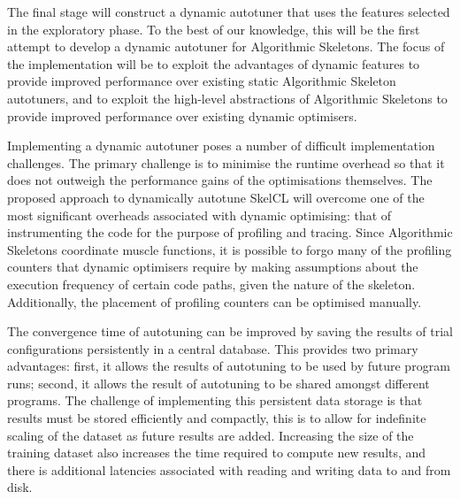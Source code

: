 The final stage will construct a dynamic autotuner that uses the
features selected in the exploratory phase. To the best of our
knowledge, this will be the first attempt to develop a dynamic
autotuner for Algorithmic Skeletons. The focus of the implementation
will be to exploit the advantages of dynamic features to provide
improved performance over existing static Algorithmic Skeleton
autotuners, and to exploit the high-level abstractions of Algorithmic
Skeletons to provide improved performance over existing dynamic
optimisers.

Implementing a dynamic autotuner poses a number of difficult
implementation challenges. The primary challenge is to minimise the
runtime overhead so that it does not outweigh the performance gains of
the optimisations themselves. The proposed approach to dynamically
autotune SkelCL will overcome one of the most significant overheads
associated with dynamic optimising: that of instrumenting the code for
the purpose of profiling and tracing. Since Algorithmic Skeletons
coordinate muscle functions, it is possible to forgo many of the
profiling counters that dynamic optimisers require by making
assumptions about the execution frequency of certain code paths, given
the nature of the skeleton. Additionally, the placement of profiling
counters can be optimised manually.

The convergence time of autotuning can be improved by saving the
results of trial configurations persistently in a central
database. This provides two primary advantages: first, it allows the
results of autotuning to be used by future program runs; second, it
allows the result of autotuning to be shared amongst different
programs. The challenge of implementing this persistent data storage
is that results must be stored efficiently and compactly, this is to
allow for indefinite scaling of the dataset as future results are
added. Increasing the size of the training dataset also increases the
time required to compute new results, and there is additional
latencies associated with reading and writing data to and from disk.

